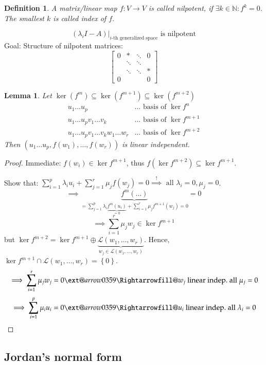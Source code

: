 \documentclass[a4paper]{article}
\makeatletter
\newcounter{lecref}[section]
\numberwithin{lecref}{section}
\newtheorem{definition}[lecref]{Definition}
\newtheorem{lemma}[lecref]{Lemma}
\newcommand{\set}[1]{\left\{#1\right\}}
\newcommand{\xRightarrow}[2][]{\ext@arrow 0359\Rightarrowfill@{#1}{#2}}
\makeatother
\begin{document}
\begin{definition} %
  A matrix/linear map $f: V \to V$ is called \emph{nilpotent}, if $\exists k \in \mathbb N: f^k = 0$.
  The smallest $k$ is called \emph{index} of $f$.
\end{definition}
\[ (\lambda_i I - A)|_{i\text{-th generalized space}} \text{ is nilpotent} \]
Goal: Structure of nilpotent matrices:
\[
  \begin{bmatrix}
    0 & * & \ddots & 0 \\
      & \ddots & \ddots & \\
      & \ddots & \ddots & * \\
    0 &  & & 0
  \end{bmatrix}
\]

\begin{lemma} %
  \label{lemma1117}
  Let $\ker(f^m) \subseteq \ker(f^{m+1}) \subseteq \ker(f^{m+2})$
  \begin{align*}
    u_1 \dots u_p & \dots \text{ basis of } \ker{f^n} \\
    u_1 \dots u_p v_1 \dots v_k & \dots \text{ basis of } \ker{f^{m+1}} \\
    u_1 \dots u_p v_1 \dots v_k w_1 \dots w_r & \dots \text{ basis of } \ker{f^{m+2}}
  \end{align*}
  Then $(u_1 \dots u_p, f(w_1), \dots, f(w_r))$ is linear independent.
\end{lemma}

\begin{proof}
  Immediate: $f(w_i) \in \ker{f^{m+1}}$, thus $f(\ker{f^{m+2}}) \subseteq \ker{f^{m+1}}$.

  Show that: $\sum_{i=1}^p \lambda_i u_i + \sum_{j=1}^r \mu_j f(w_j) = 0 \overset!\implies \text{ all } \lambda_i = 0, \mu_j = 0$.
  \[ \implies \underbrace{f^m(\dots)}_{= \sum_{j=1}^p \lambda_i \underbrace{f^m(u_i)}_{=0} + \sum_{i=1}^r \mu_j f^{m+1}(w_j) = 0} = 0 \]
  \[ \implies \sum_{i=1}^r \mu_j w_j \in \ker{f^{m+1}} \]
  but $\ker{f^{m+2}} = \ker{f^{m+1}} \oplus \underbrace{\mathcal L(w_1, \dots, w_r)}_{w_j \in \mathcal L(w_1, \dots, w_r)}$.
  Hence, $\ker{f^{m+1}} \cap \mathcal L(w_1, \dots, w_r) = \set{0}$.
  \[ \implies \sum_{i=1}^r \mu_j w_j = 0 \xRightarrow{w_j \text{ linear indep.}} \text{ all } \mu_j = 0 \]
  \[ \implies \sum_{i=1}^p \mu_i u_i = 0 \xRightarrow{u_i \text{ linear indep.}} \text{ all } \lambda_i = 0 \]
\end{proof}

\subsection{Jordan's normal form}
\end{document}
